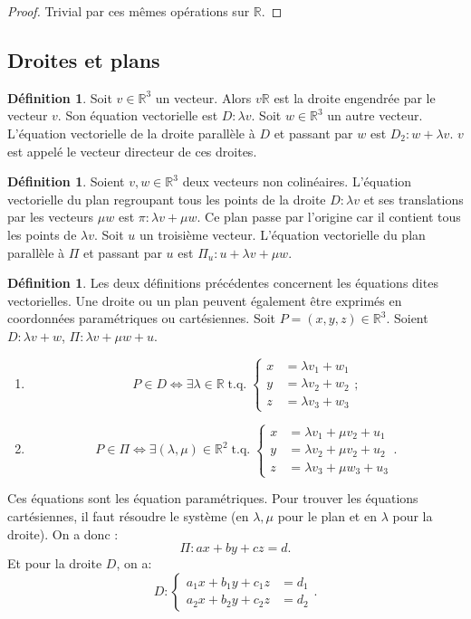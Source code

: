 \documentclass{article}
\DeclareMathOperator{\tq}{\text{ t.q. }}
\newcommand{\R}{\mathbb R}
\theoremstyle{definition}
\newtheorem{déf}[thm]{Définition}
\theoremstyle{remark}
\begin{document}
		\begin{proof} Trivial par ces mêmes opérations sur $\R$. \end{proof}

	\subsection{Droites et plans}
		\begin{déf} Soit $v \in \R^3$ un vecteur. Alors $v\R$ est la droite engendrée par le vecteur $v$. Son équation vectorielle est $D : \lambda v$. Soit $w \in \R^3$
		un autre vecteur. L'équation vectorielle de la droite parallèle à $D$ et passant par $w$ est $D_2 : w + \lambda v$. $v$ est appelé le vecteur directeur de ces droites.
		\end{déf}

		\begin{déf} Soient $v, w \in \R^3$ deux vecteurs non colinéaires. L'équation vectorielle du plan regroupant tous les points de la droite $D : \lambda v$ et ses
		translations par les vecteurs $\mu w$ est $\pi : \lambda v + \mu w$. Ce plan passe par l'origine car il contient tous les points de $\lambda v$. Soit $u$ un troisième
		vecteur. L'équation vectorielle du plan parallèle à $\Pi$ et passant par $u$ est $\Pi_u : u + \lambda v + \mu w$. \end{déf}

		\begin{déf} Les deux définitions précédentes concernent les équations dites vectorielles. Une droite ou un plan peuvent également être exprimés en coordonnées
		paramétriques ou cartésiennes. Soit $P = (x, y, z) \in \R^3$. Soient $D : \lambda v + w$, $\Pi : \lambda v + \mu w + u$.
		\begin{enumerate}
			\item \[P \in D \iff \exists \lambda \in \R \tq \left\{\begin{aligned}x &= \lambda v_1 + w_1 \\y &= \lambda v_2 + w_2 \\z &= \lambda v_3 + w_3\end{aligned}\right. ;\]
			\item \[P \in \Pi \iff \exists (\lambda, \mu) \in \R^2 \tq
			\left\{\begin{aligned}
				x &= \lambda v_1 + \mu v_2 + u_1 \\y &= \lambda v_2 + \mu v_2 + u_2 \\z &= \lambda v_3 + \mu w_3 + u_3
			\end{aligned}\right..\]
		\end{enumerate}

		Ces équations sont les équation paramétriques. Pour trouver les équations cartésiennes, il faut résoudre le système (en $\lambda, \mu$ pour le plan et en $\lambda$
		pour la droite). On a donc :
		\[\Pi : ax + by + cz = d.\]
		Et pour la droite $D$, on a:
		\[D : \left\{\begin{aligned}a_1x + b_1y + c_1z &= d_1 \\a_2x + b_2y + c_2z &= d_2\end{aligned}\right..\] \end{déf}
\end{document}
